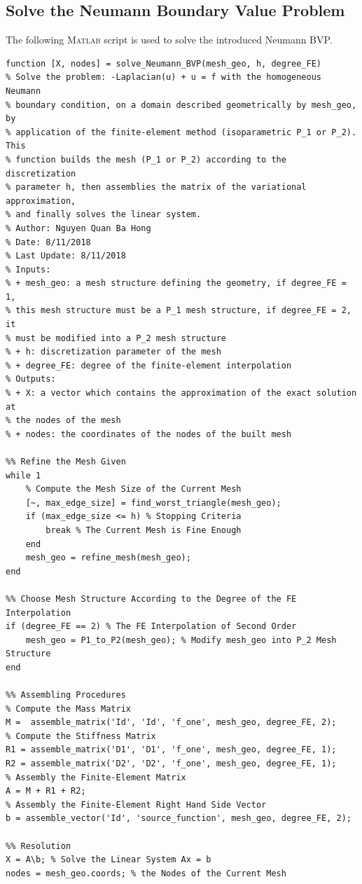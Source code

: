\documentclass[11pt,a4paper,center,notitlepage]{article}
\numberwithin{equation}{section}
\begin{document}
\subsection{Solve the Neumann Boundary Value Problem}\label{sec3.4}
The following \textsc{Matlab} script is used to solve the introduced Neumann BVP.
\begin{verbatim}
function [X, nodes] = solve_Neumann_BVP(mesh_geo, h, degree_FE)
% Solve the problem: -Laplacian(u) + u = f with the homogeneous Neumann
% boundary condition, on a domain described geometrically by mesh_geo, by 
% application of the finite-element method (isoparametric P_1 or P_2). This
% function builds the mesh (P_1 or P_2) according to the discretization
% parameter h, then assemblies the matrix of the variational approximation,
% and finally solves the linear system.
% Author: Nguyen Quan Ba Hong
% Date: 8/11/2018
% Last Update: 8/11/2018
% Inputs:
% + mesh_geo: a mesh structure defining the geometry, if degree_FE = 1,
% this mesh structure must be a P_1 mesh structure, if degree_FE = 2, it
% must be modified into a P_2 mesh structure 
% + h: discretization parameter of the mesh
% + degree_FE: degree of the finite-element interpolation
% Outputs:
% + X: a vector which contains the approximation of the exact solution at
% the nodes of the mesh
% + nodes: the coordinates of the nodes of the built mesh 

%% Refine the Mesh Given
while 1
    % Compute the Mesh Size of the Current Mesh
    [~, max_edge_size] = find_worst_triangle(mesh_geo);
    if (max_edge_size <= h) % Stopping Criteria
        break % The Current Mesh is Fine Enough
    end
    mesh_geo = refine_mesh(mesh_geo);
end

%% Choose Mesh Structure According to the Degree of the FE Interpolation
if (degree_FE == 2) % The FE Interpolation of Second Order
    mesh_geo = P1_to_P2(mesh_geo); % Modify mesh_geo into P_2 Mesh Structure
end

%% Assembling Procedures
% Compute the Mass Matrix
M =  assemble_matrix('Id', 'Id', 'f_one', mesh_geo, degree_FE, 2);
% Compute the Stiffness Matrix
R1 = assemble_matrix('D1', 'D1', 'f_one', mesh_geo, degree_FE, 1);
R2 = assemble_matrix('D2', 'D2', 'f_one', mesh_geo, degree_FE, 1);
% Assembly the Finite-Element Matrix
A = M + R1 + R2;
% Assembly the Finite-Element Right Hand Side Vector
b = assemble_vector('Id', 'source_function', mesh_geo, degree_FE, 2);

%% Resolution
X = A\b; % Solve the Linear System Ax = b
nodes = mesh_geo.coords; % the Nodes of the Current Mesh
\end{verbatim}
\end{document}
